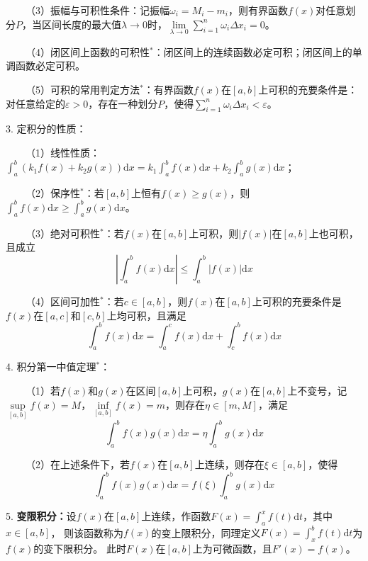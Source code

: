 ~~~~（3）振幅与可积性条件：记振幅$\omega_i=M_i-m_i$，则有界函数$f(x)$对任意划分$P$，当区间长度的最大值$\lambda \rightarrow 0 $时，$\lim\limits_{\lambda \rightarrow 0}\sum\limits_{i=1}^n \omega_i\Delta x_i= 0$。

~~~~（4）闭区间上函数的可积性$^*$：闭区间上的连续函数必定可积；闭区间上的单调函数必定可积。

~~~~（5）可积的常用判定方法$^*$：有界函数$f(x)$在$[a,b]$上可积的充要条件是：对任意给定的$\varepsilon>0$，存在一种划分$P$，使得$\sum\limits_{i=1}^n \omega_i \Delta x_i <\varepsilon$。

3. 定积分的性质：

~~~~（1）线性性质：$\int_a^b \left(k_1f(x)+k_2g(x)\right)\mathrm{d}x=k_1\int_a^bf(x)\mathrm{d}x+k_2\int_a^bg(x)\mathrm{d}x$；

~~~~（2）保序性$^*$：若$[a,b]$上恒有$f(x)\geqslant g(x)$，则$\int_a^b f(x)\mathrm{d}x\geqslant \int_a^b g(x)\mathrm{d}x$。

~~~~（3）绝对可积性$^*$：若$f(x)$在$[a,b]$上可积，则$\left|f(x)\right|$在$[a,b]$上也可积，且成立
\begin{equation*}
    \left|\int_a^bf(x)\mathrm{d}x\right|\leqslant \int_a^b \left|f(x)\right|\mathrm{d}x
\end{equation*}

~~~~（4）区间可加性$^*$：若$c\in [a,b]$，则$f(x)$在$[a,b]$上可积的充要条件是$f(x)$在$[a,c]$和$[c,b]$上均可积，且满足
\begin{equation*}
    \int_a^b f(x)\mathrm{d}x=\int_a^c f(x)\mathrm{d}x+\int_c^b f(x)\mathrm{d}x
\end{equation*}

4. 积分第一中值定理$^*$：

~~~~（1）若$f(x)$和$g(x)$在区间$[a,b]$上可积，$g(x)$在$[a,b]$上不变号，记$\sup\limits_{[a,b]}f(x)=M$，$\inf\limits_{[a,b]}f(x)=m$，则存在$\eta \in [m,M]$，满足
\begin{equation*}
    \int_a^b f(x)g(x)\mathrm{d}x=\eta \int_a^b g(x)\mathrm{d}x
\end{equation*}

~~~~（2）在上述条件下，若$f(x)$在$[a,b]$上连续，则存在$\xi \in [a,b]$，使得
\begin{equation*}
    \int_a^b f(x)g(x)\mathrm{d}x =f(\xi) \int_a^b g(x)\mathrm{d}x
\end{equation*}

5. \textbf{变限积分：}设$f(x)$在$[a,b]$上连续，作函数$F(x)=\int_a^x f(t)\mathrm{d}t$，其中$x \in [a,b]$，
则该函数称为$f(x)$的变上限积分，同理定义$F(x)=\int_x^b f(t)\mathrm{d}t$为$f(x)$的变下限积分。
此时$F(x)$在$[a,b]$上为可微函数，且$F'(x)=f(x)$。

